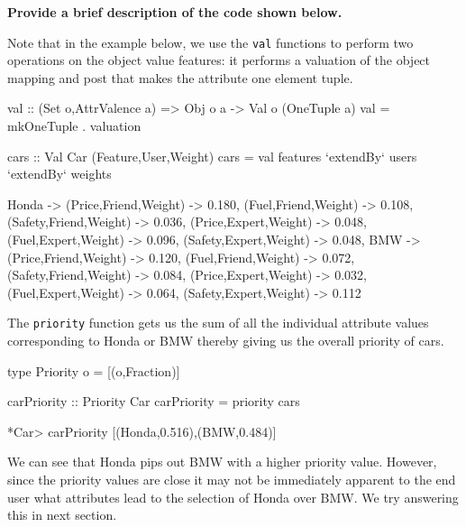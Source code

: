 \documentclass{jfp}
\newcommand{\NOTE}[2][gray]{\smallskip\noindent
  \colorbox{#1!30}{\parbox{.98\linewidth}{{\small\textbf{#2}}}}
}
\newcommand{\prog}[1]{\texttt{#1}}
\begin{document}
\NOTE{Provide a brief description of the code shown below.}







Note that in the example below, we use the \prog{val} functions to perform two operations on the object value features: it performs a valuation of the object mapping and post that makes the attribute one element tuple.
\begin{haskellcode}
val :: (Set o,AttrValence a) => Obj o a -> Val o (OneTuple a)
val = mkOneTuple . valuation

cars :: Val Car (Feature,User,Weight)
cars = val features `extendBy` users `extendBy` weights

{Honda -> {(Price,Friend,Weight) -> 0.180,
           (Fuel,Friend,Weight) -> 0.108,
           (Safety,Friend,Weight) -> 0.036,
           (Price,Expert,Weight) -> 0.048,
           (Fuel,Expert,Weight) -> 0.096,
           (Safety,Expert,Weight) -> 0.048},
 BMW -> {(Price,Friend,Weight) -> 0.120,
         (Fuel,Friend,Weight) -> 0.072,
         (Safety,Friend,Weight) -> 0.084,
         (Price,Expert,Weight) -> 0.032,
         (Fuel,Expert,Weight) -> 0.064,
         (Safety,Expert,Weight) -> 0.112}}
\end{haskellcode}

The \prog{priority} function gets us the sum of all the individual attribute values corresponding to Honda or BMW thereby giving us the overall priority of cars.
\begin{haskellcode}
type Priority o = [(o,Fraction)]

carPriority :: Priority Car 
carPriority = priority cars

*Car> carPriority
[(Honda,0.516),(BMW,0.484)]
\end{haskellcode}
We can see that Honda pips out BMW with a higher priority value. However, since the priority values are close it may not be immediately apparent to the end user what attributes lead to the selection of Honda over BMW. We try answering this in next section. 
\end{document}

